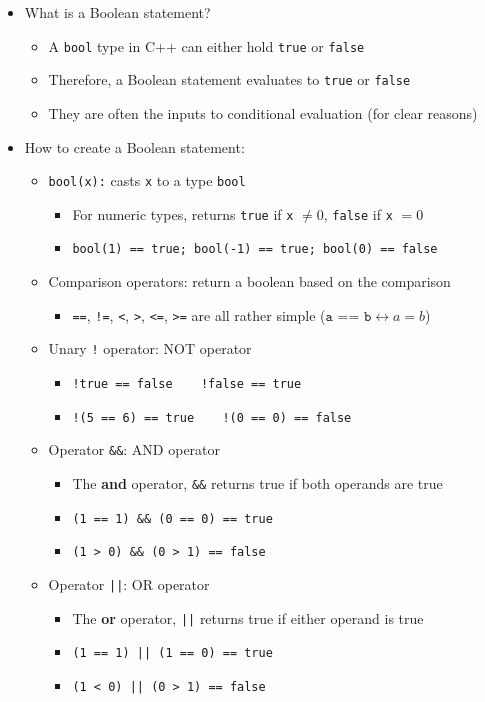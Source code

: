 \documentclass{article}
\begin{document}
\begin{itemize}
	\item What is a Boolean statement?
	\begin{itemize}
		\item A \texttt{bool} type in C++ can either hold \texttt{true} or \texttt{false}
		\item Therefore, a Boolean statement evaluates to \texttt{true} or \texttt{false}
		\item They are often the inputs to conditional evaluation (for clear reasons)
	\end{itemize}
	\item How to create a Boolean statement:
	\begin{itemize}
		\item \texttt{bool(x):} casts \texttt{x} to a type \texttt{bool}
		\begin{itemize}
			\item For numeric types, returns \texttt{true} if \texttt{x} $\neq 0$, \texttt{false} if \texttt{x} $ = 0$
			\item \texttt{bool(1) == true;    bool(-1) == true;    bool(0) == false}
		\end{itemize}
		\item Comparison operators: return a boolean based on the comparison
		\begin{itemize}
			\item \texttt{==}, \texttt{!=}, \texttt{<}, \texttt{>}, \texttt{<=}, \texttt{>=} are all rather simple ($\texttt{a == b} \leftrightarrow a=b$)
		\end{itemize}
		\item Unary \texttt{!} operator: NOT operator
		\begin{itemize}
			\item \texttt{!true == false $\quad$ !false == true}
			\item \texttt{!(5 == 6) == true $\quad$ !(0 == 0) == false}
		\end{itemize}
		\item Operator \texttt{\&\&}: AND operator
		\begin{itemize}
			\item The \textbf{and} operator, \texttt{\&\&} returns true if both operands are true
			\item \texttt{(1 == 1) \&\& (0 == 0) == true}
			\item \texttt{(1 > 0) \&\& (0 > 1) == false}
		\end{itemize}
		\item Operator \texttt{||}: OR operator
		\begin{itemize}
			\item The \textbf{or} operator, \texttt{||} returns true if either operand is true
			\item \texttt{(1 == 1) || (1 == 0) == true}
			\item \texttt{(1 < 0) || (0 > 1) == false}
		\end{itemize}
	\end{itemize}
\end{itemize}
\end{document}
